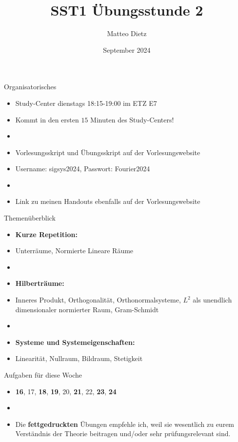 \documentclass[14pt, aspectratio=169, handout]{beamer}
\title{SST1 Übungsstunde 2}
\author{Matteo Dietz}
\date{September 2024}
\begin{document}
\maketitle

\begin{frame}{Organisatorisches}
    \begin{itemize}
        \item \alert{Study-Center dienstags 18:15-19:00 im ETZ E7}
        \item[] Kommt in den ersten $15$ Minuten des Study-Centers!
        \item[]
        \item Vorlesungsskript und Übungsskript auf der Vorlesungswebsite
        \item[] Username: sigsys2024, \hspace{10pt} Passwort: Fourier2024
        \item[] 
        \item Link zu meinen Handouts ebenfalls auf der Vorlesungswebsite
    \end{itemize}
\end{frame}

\begin{frame}{Themenüberblick}
    \begin{itemize}
    \item \textbf{Kurze Repetition:}
    \item[] Unterräume, Normierte Lineare Räume
    \item[] 
    \item \textbf{Hilberträume:}
    \item[] Inneres Produkt, Orthogonalität, Orthonormalsysteme, $L^2$ als unendlich dimensionaler normierter Raum, Gram-Schmidt
    \item[] 
    \item \textbf{Systeme und Systemeigenschaften:}
    \item[] Linearität, Nullraum, Bildraum, Stetigkeit
\end{itemize}
\end{frame}

\begin{frame}{Aufgaben für diese Woche}
    \begin{itemize}
        \item[] \textbf{16}, 17, \textbf{18}, \textbf{19}, 20, \textbf{21}, 22, \textbf{23}, \textbf{24}
        \item[] 
        \item[] Die \textbf{fettgedruckten} Übungen empfehle ich, weil sie wesentlich zu eurem Verständnis der Theorie beitragen und/oder sehr prüfungsrelevant sind.
    \end{itemize}
\end{frame}
\end{document}
